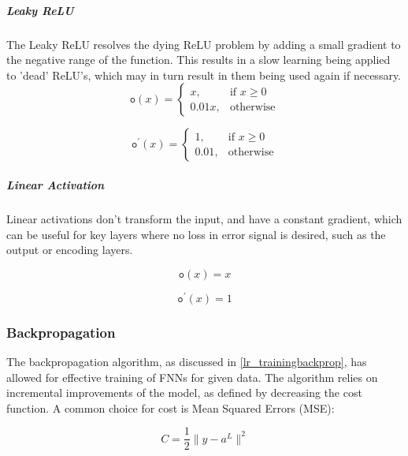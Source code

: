 \documentclass[a4paper,11pt,oneside]{article}
\theoremstyle{plain}
\theoremstyle{definition}
\begin{document}
\subparagraph{Leaky ReLU}

The Leaky ReLU resolves the dying ReLU problem by adding a small gradient to the negative range of the function. This results in a slow learning being applied to 'dead' ReLU's, which may in turn result in them being used again if necessary.
\begin{equation}\end{equation}\label{func_leaky_relu}
\[
\texttt{o}(x)= 
\begin{cases}
x,& \text{if } x\geq 0\\
0.01x,              & \text{otherwise}
\end{cases}
\]

\begin{equation}\end{equation}\label{func_leaky_relu_prime}
\[
\texttt{o}^\prime(x)= 
\begin{cases}
1,& \text{if } x\geq 0\\
0.01,              & \text{otherwise}
\end{cases}
\]

\subparagraph{Linear Activation}

Linear activations don't transform the input, and have a constant gradient, which can be useful for key layers where no loss in error signal is desired, such as the output or encoding layers.

\begin{equation}\label{func_linear}
\texttt{o}(x) = x
\end{equation}

\begin{equation}\label{func_linear_prime}
\texttt{o}^\prime(x) = 1
\end{equation}

\subsubsection{Backpropagation}\label{imp_backprop}

The backpropagation algorithm, as discussed in \ref{lr_trainingbackprop}, has allowed for effective training of FNNs for given data. The algorithm relies on incremental improvements of the model, as defined by decreasing the cost function. A common choice for cost is Mean Squared Errors (MSE):

\begin{equation}\label{func_MSE}
C = \frac{1}{2} \rVert y - a^L \rVert^2
\end{equation}
~\\
\end{document}
